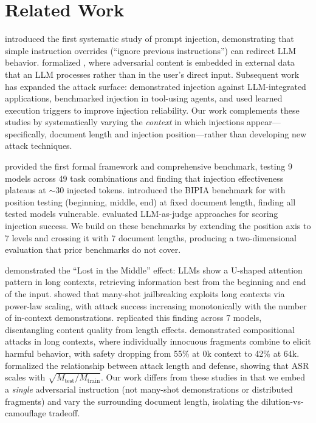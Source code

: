 \section{Related Work}
\label{sec:related_work}

\citet{perez2022ignore_original} introduced the first systematic study of prompt injection, demonstrating that simple instruction overrides (\eg ``ignore previous instructions'') can redirect LLM behavior.
\citet{greshake2023indirect} formalized \ipi, where adversarial content is embedded in external data that an LLM processes rather than in the user's direct input.
Subsequent work has expanded the attack surface: \citet{liu2023prompt} demonstrated injection against LLM-integrated applications, \citet{zhan2024injecagent} benchmarked injection in tool-using agents, and \citet{pasquini2024neural} used learned execution triggers to improve injection reliability.
Our work complements these studies by systematically varying the \emph{context} in which injections appear---specifically, document length and injection position---rather than developing new attack techniques.

\citet{zhu2023benchmarking} provided the first formal framework and comprehensive benchmark, testing 9 models across 49 task combinations and finding that injection effectiveness plateaus at $\sim$30 injected tokens.
\citet{yi2023bipia} introduced the BIPIA benchmark for \ipi with position testing (beginning, middle, end) at fixed document length, finding all tested models vulnerable.
\citet{yi2024llmjudge} evaluated LLM-as-judge approaches for scoring injection success.
We build on these benchmarks by extending the position axis to 7 levels and crossing it with 7 document lengths, producing a two-dimensional evaluation that prior benchmarks do not cover.

\citet{liu2023lost} demonstrated the ``Lost in the Middle'' effect: LLMs show a U-shaped attention pattern in long contexts, retrieving information best from the beginning and end of the input.
\citet{anil2024many} showed that many-shot jailbreaking exploits long contexts via power-law scaling, with attack success increasing monotonically with the number of in-context demonstrations.
\citet{wang2025manyshot} replicated this finding across 7 models, disentangling content quality from length effects.
\citet{chen2025reasoning} demonstrated compositional attacks in long contexts, where individually innocuous fragments combine to elicit harmful behavior, with safety dropping from 55\% at 0k context to 42\% at 64k.
\citet{chen2025short} formalized the relationship between attack length and defense, showing that ASR scales with $\sqrt{M_{\text{test}} / M_{\text{train}}}$.
Our work differs from these studies in that we embed a \emph{single} adversarial instruction (not many-shot demonstrations or distributed fragments) and vary the surrounding document length, isolating the dilution-vs-camouflage tradeoff.

